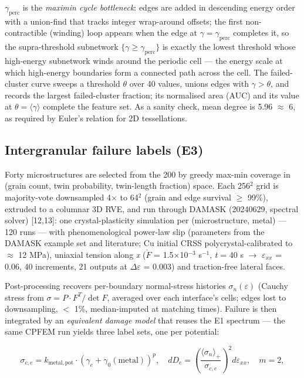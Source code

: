 \documentclass[11pt]{article}
\begin{document}
$\gamma_{\mathrm{perc}}$ is the \textit{maximin cycle bottleneck}: edges are added in descending energy order with a union-find that tracks integer wrap-around offsets; the first non-contractible (winding) loop appears when the edge at $\gamma = \gamma_{\mathrm{perc}}$ completes it, so the supra-threshold subnetwork $\{\gamma \ge \gamma_{\mathrm{perc}}\}$ is exactly the lowest threshold whose high-energy subnetwork winds around the periodic cell --- the energy scale at which high-energy boundaries form a connected path across the cell. The failed-cluster curve sweeps a threshold $\theta$ over 40 values, unions edges with $\gamma > \theta$, and records the largest failed-cluster fraction; its normalised area (AUC) and its value at $\theta = \langle\gamma\rangle$ complete the feature set. As a sanity check, mean degree is 5.96 $\approx$ 6, as required by Euler's relation for 2D tessellations.

\subsection{Intergranular failure labels (E3)}

Forty microstructures are selected from the 200 by greedy max-min coverage in (grain count, twin probability, twin-length fraction) space. Each 256$^{2}$ grid is majority-vote downsampled 4$\times$ to 64$^{2}$ (grain and edge survival $\ge$ 99\%), extruded to a columnar 3D RVE, and run through DAMASK (20240629, spectral solver) [12,13]: one crystal-plasticity simulation per (microstructure, metal) --- 120 runs --- with phenomenological power-law slip (parameters from the DAMASK example set and literature; Cu initial CRSS polycrystal-calibrated to $\approx$ 12 MPa), uniaxial tension along \textit{x} ($\dot F$ = 1.5$\times$10$^{-3}$ s$^{-1}$, \textit{t} = 40 s $\rightarrow$ $\varepsilon_{xx}$ = 0.06, 40 increments, 21 outputs at $\Delta\varepsilon$ = 0.003) and traction-free lateral faces.

Post-processing recovers per-boundary normal-stress histories $\sigma_n(\varepsilon)$ (Cauchy stress from $\sigma = P\cdot F^{T}/\det F$, averaged over each interface's cells; edges lost to downsampling, $<$ 1\%, median-imputed at matching times). Failure is then integrated by an \textit{equivalent damage model} that reuses the E1 spectrum --- the same CPFEM run yields three label sets, one per potential:

\[
\sigma_{c,e} = k_{\mathrm{metal,pot}} \cdot \left(\gamma_e + \gamma_0(\mathrm{metal})\right)^{p}, \quad
dD_e = \left(\frac{\langle\sigma_n\rangle_{+}}{\sigma_{c,e}}\right)^{2} d\varepsilon_{xx}, \quad m = 2,
\]
\end{document}

